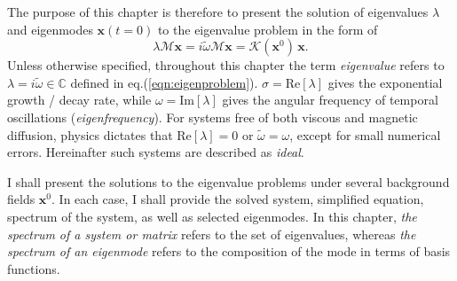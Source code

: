 The purpose of this chapter is therefore to present the solution of eigenvalues $\lambda$ and eigenmodes $\mathbf{x}(t=0)$ to the eigenvalue problem in the form of
\begin{equation}\label{eqn:eigenproblem}
    \lambda \mathcal{M} \mathbf{x} = i \widetilde{\omega} \mathcal{M} \mathbf{x} = \mathcal{K}(\mathbf{x}^0) \, \mathbf{x}.
\end{equation}
Unless otherwise specified, throughout this chapter the term \textit{eigenvalue} refers to $\lambda = i\widetilde{\omega} \in \mathbb{C}$ defined in eq.(\ref{eqn:eigenproblem}). $\sigma = \mathrm{Re}[\lambda]$ gives the exponential growth / decay rate, while $\omega = \mathrm{Im}[\lambda]$ gives the angular frequency of temporal oscillations (\textit{eigenfrequency}).
For systems free of both viscous and magnetic diffusion, physics dictates that $\mathrm{Re}[\lambda] = 0$ or $\widetilde{\omega} = \omega$, except for small numerical errors. Hereinafter such systems are described as \textit{ideal}.

I shall present the solutions to the eigenvalue problems under several background fields $\mathbf{x}^0$. In each case, I shall provide the solved system, simplified equation, spectrum of the system, as well as selected eigenmodes.
In this chapter, \textit{the spectrum of a system or matrix} refers to the set of eigenvalues, whereas \textit{the spectrum of an eigenmode} refers to the composition of the mode in terms of basis functions.

\clearpage








